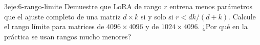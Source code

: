\begin{ejercicio}{3}{eje:6-rango-limite}
Demuestre que LoRA de rango $r$ entrena menos parámetros que el ajuste completo de una matriz $d\times k$ si y solo si $r<dk/(d+k)$. Calcule el rango límite para matrices de $4096\times 4096$ y de $1024\times 4096$. ¿Por qué en la práctica se usan rangos mucho menores?
\end{ejercicio}
